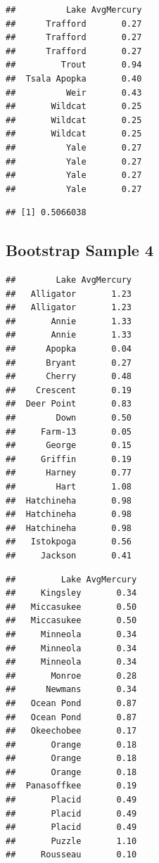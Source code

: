 \documentclass[]{book}
\newenvironment{Shaded}{\begin{snugshade}}{\end{snugshade}}
\newcommand{\KeywordTok}[1]{\textcolor[rgb]{0.13,0.29,0.53}{\textbf{#1}}}
\newcommand{\OperatorTok}[1]{\textcolor[rgb]{0.81,0.36,0.00}{\textbf{#1}}}
\newcommand{\NormalTok}[1]{#1}
\begin{document}
\begin{verbatim}
##          Lake AvgMercury
##      Trafford       0.27
##      Trafford       0.27
##      Trafford       0.27
##         Trout       0.94
##  Tsala Apopka       0.40
##          Weir       0.43
##       Wildcat       0.25
##       Wildcat       0.25
##       Wildcat       0.25
##          Yale       0.27
##          Yale       0.27
##          Yale       0.27
##          Yale       0.27
\end{verbatim}

\begin{Shaded}
\end{Shaded}

\begin{verbatim}
## [1] 0.5066038
\end{verbatim}

\subsection{Bootstrap Sample 4}\label{bootstrap-sample-4}

\begin{verbatim}
##        Lake AvgMercury
##   Alligator       1.23
##   Alligator       1.23
##       Annie       1.33
##       Annie       1.33
##      Apopka       0.04
##      Bryant       0.27
##      Cherry       0.48
##    Crescent       0.19
##  Deer Point       0.83
##        Down       0.50
##     Farm-13       0.05
##      George       0.15
##     Griffin       0.19
##      Harney       0.77
##        Hart       1.08
##  Hatchineha       0.98
##  Hatchineha       0.98
##  Hatchineha       0.98
##   Istokpoga       0.56
##     Jackson       0.41
\end{verbatim}

\begin{verbatim}
##         Lake AvgMercury
##     Kingsley       0.34
##   Miccasukee       0.50
##   Miccasukee       0.50
##     Minneola       0.34
##     Minneola       0.34
##     Minneola       0.34
##       Monroe       0.28
##      Newmans       0.34
##   Ocean Pond       0.87
##   Ocean Pond       0.87
##   Okeechobee       0.17
##       Orange       0.18
##       Orange       0.18
##       Orange       0.18
##  Panasoffkee       0.19
##       Placid       0.49
##       Placid       0.49
##       Placid       0.49
##       Puzzle       1.10
##     Rousseau       0.10
\end{verbatim}
\end{document}
